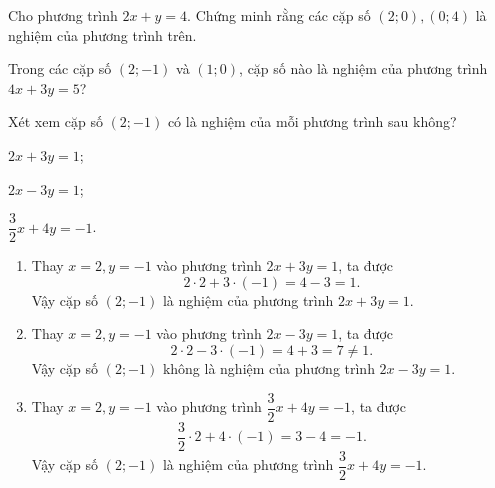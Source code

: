 \begin{vd}
	Cho phương trình $2x+y=4$. Chứng minh rằng các cặp số $(2;0), (0;4)$ là nghiệm của phương trình trên.
\end{vd}
\begin{vd}
	Trong các cặp số $(2;-1)$ và $(1;0)$, cặp số nào là nghiệm của phương trình $4x+3y=5$?
\end{vd}
\begin{vd}%
	Xét xem cặp số $(2;-1)$ có là nghiệm của mỗi phương trình sau không?
	\begin{enumEX}{3}
	\item $2x + 3y = 1$;
	\item $2x - 3y = 1$;
	\item $\dfrac{3}{2}x + 4y = - 1$.
	\end{enumEX}
	\loigiai
	{
	\begin{enumerate}
	\item Thay $x = 2 , y = - 1$ vào phương trình $2x + 3y = 1$, ta được
	\[2\cdot2 + 3 \cdot( - 1) = 4 - 3 = 1.\]
	Vậy cặp số $(2;-1)$ là nghiệm của phương trình $2x + 3y = 1$.
	\item Thay $x = 2 , y = - 1$ vào phương trình $2x - 3y = 1$, ta được
	\[2\cdot2 - 3 \cdot( - 1) = 4 + 3 = 7\ne 1.\]
	Vậy cặp số $(2;-1)$ không là nghiệm của phương trình $2x - 3y = 1$.
	\item Thay $x = 2 , y = - 1$ vào phương trình $\dfrac{3}{2}x + 4y = - 1$, ta được
	\[\dfrac{3}{2}\cdot2 + 4 \cdot( - 1) = 3 - 4 = -1.\]
	Vậy cặp số $(2;-1)$ là nghiệm của phương trình $\dfrac{3}{2}x + 4y = - 1$.
	\end{enumerate}
	}
\end{vd}
